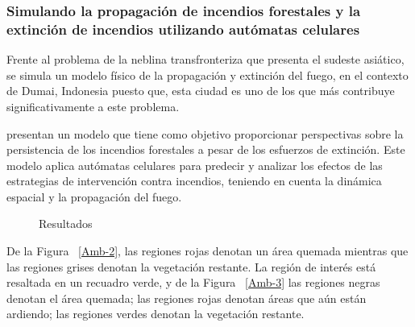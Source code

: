 \documentclass[10pt,conference]{IEEEtran}
\begin{document}
\subsubsection{\textbf{Simulando la propagación de incendios forestales y la extinción de incendios utilizando autómatas celulares}}
Frente al problema de la neblina transfronteriza que presenta el sudeste asiático, se simula un modelo físico de la propagación y extinción del fuego, en el contexto de Dumai, Indonesia puesto que, esta ciudad es uno de los que más contribuye significativamente a este problema.\par
{} presentan un modelo que tiene como objetivo proporcionar perspectivas sobre la persistencia de los incendios forestales a pesar de los esfuerzos de extinción. Este modelo aplica autómatas celulares para predecir y analizar los efectos de las estrategias de intervención contra incendios, teniendo en cuenta la dinámica espacial y la propagación del fuego.
\begin{figure}[H]
\centering
 \caption{Resultados}
 \label{figuras1-2}
\end{figure}
De la Figura ~\ref{Amb-2}, las regiones rojas denotan un área quemada mientras que las regiones grises denotan la vegetación restante. La región de interés está resaltada en un recuadro verde, y de la Figura ~\ref{Amb-3} las regiones negras denotan el área quemada; las regiones rojas denotan áreas que aún están ardiendo; las regiones verdes denotan la vegetación restante.
\end{document}
